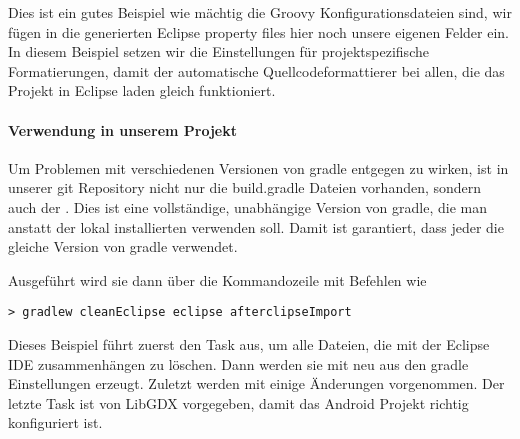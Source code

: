 Dies ist ein gutes Beispiel wie mächtig die Groovy Konfigurationsdateien sind, wir fügen in die generierten Eclipse property files hier noch unsere eigenen Felder ein.
In diesem Beispiel setzen wir die Einstellungen für projektspezifische Formatierungen, damit der automatische Quellcodeformattierer bei allen, die das Projekt in Eclipse laden gleich funktioniert.

\paragraph{Verwendung in unserem Projekt}

Um Problemen mit verschiedenen Versionen von gradle entgegen zu wirken, ist in unserer git Repository nicht nur die build.gradle Dateien vorhanden, sondern auch der . Dies ist eine vollständige, unabhängige Version von gradle, die man anstatt der lokal installierten verwenden soll. Damit ist garantiert, dass jeder die gleiche Version von gradle verwendet.

Ausgeführt wird sie dann über die Kommandozeile mit Befehlen wie

\begin{lstlisting}[caption=Gradle in der Kommandozeile, title=\hspace{0 pt}, style=cmd]
> gradlew cleanEclipse eclipse afterclipseImport
\end{lstlisting}

Dieses Beispiel führt zuerst den Task  aus, um alle Dateien, die mit der Eclipse IDE zusammenhängen zu löschen. Dann werden sie mit  neu aus den gradle Einstellungen erzeugt. Zuletzt werden mit  einige Änderungen vorgenommen. Der letzte Task ist von LibGDX vorgegeben, damit das Android Projekt richtig konfiguriert ist.

